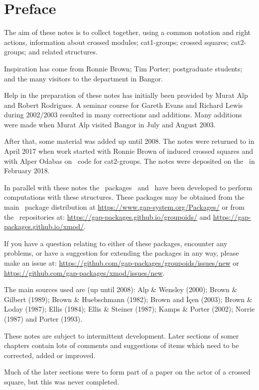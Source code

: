 
\section*{Preface}


The aim of these notes is to collect together, using a common notation
and right actions, information about crossed modules; cat1-groups;
crossed squares; cat2-groups; and related structures.

Inspiration has come from Ronnie Brown; Tim Porter; postgraduate students;
and the many visitors to the department in Bangor.

Help in the preparation of these notes has initially been 
provided by Murat Alp and Robert Rodrigues.
A seminar course for Gareth Evans and Richard Lewis during 2002/2003 
resulted in many corrections and additions.
Many additions were made when Murat Alp visited Bangor in July and August 2003.

After that, some material was added up until 2008. 
The notes were returned to in April 2017 when work started with Ronnie Brown 
of induced crossed squares and with Alper Odabas on \GAP\ code for cat2-groups. 
The notes were deposited on the \arXiv\ in February 2018. 

In parallel with these notes the \GAP\ packages \XMod\ and \Groupoids\ 
have been developed to perform computations with these structures. 
These packages may be obtained from the main \GAP\ package distribution at
\url{https://www.gap-system.org/Packages/} 
or from the \GitHub\ repositories at:
\url{https://gap-packages.github.io/groupoids/} and
\url{https://gap-packages.github.io/xmod/}. 

If you have a question relating to either of these packages, encounter any problems, 
or have a suggestion for extending the packages in any way, please 
make an issue at: \url{https://github.com/gap-packages/groupoids/issues/new} 
or \url{https://github.com/gap-packages/xmod/issues/new}. 

\bigskip
The main sources used are (up until 2008): 
Alp \& Wensley \cite{alp:wens-ijac} (2000); 
Brown \& Gilbert \cite{brow:gilb} (1989); 
Brown \& Huebschmann \cite{brow:hueb} (1982); 
Brown and \.{I}\c{c}en \cite{brow:icen} (2003); 
Brown \& Loday \cite{brow:lod} (1987); 
Ellis \cite{ellis-thesis} (1984); 
Ellis \& Steiner \cite{ell:st} (1987); 
Kamps \& Porter \cite{kamps:port} (2002); 
Norrie \cite{norrie-thesis} (1987) and 
Porter \cite{porter:top} (1993).

\bigskip

These notes are subject to intermittent development. 
Later sections of somer chapters contain lots of comments and suggestions 
of items which need to be corrected, added or improved.

Much of the later sections were to form part of a paper 
on the actor of a crossed square, but this was never completed. 
